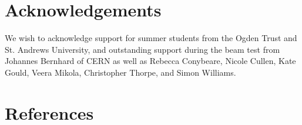 \documentclass[instruments,article,submit,moreauthors,pdftex]{Definitions/mdpi}
\begin{document}
	

	\linenumbers

	

	

	

	


	\newenvironment{acknowledgement}{\relax}{\relax}
	\begin{acknowledgement}
		\section*{Acknowledgements}
		We wish to acknowledge support for summer students from the Ogden Trust and St. Andrews University, and outstanding support during the beam test from Johannes Bernhard of CERN as well as
		Rebecca Conybeare, Nicole Cullen, Kate Gould, Veera Mikola, Christopher Thorpe, and	Simon Williams.
	\end{acknowledgement}



	\section*{References}
    
\end{document}
